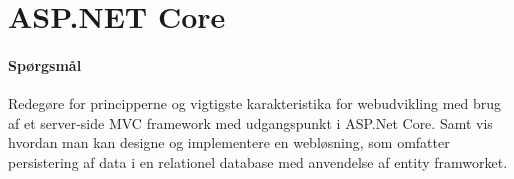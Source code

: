 \section{ASP.NET Core}

\paragraph{Spørgsmål}
Redegøre for principperne og vigtigste karakteristika for webudvikling med brug af et server-side MVC framework med udgangspunkt i ASP.Net Core. Samt vis hvordan man kan designe og implementere en	webløsning, som omfatter persistering af data i en relationel database med anvendelse af entity framworket.
